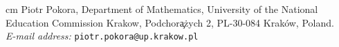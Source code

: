 \documentclass[12pt]{article}
\theoremstyle{plain}
\theoremstyle{definition}
\begin{document}
 cm
\bigskip
Piotr Pokora,
Department of Mathematics,
University of the National Education Commission Krakow,
Podchor\c a\.zych 2,
PL-30-084 Krak\'ow, Poland. \\
\nopagebreak
\textit{E-mail address:} \texttt{piotr.pokora@up.krakow.pl}
\end{document}
